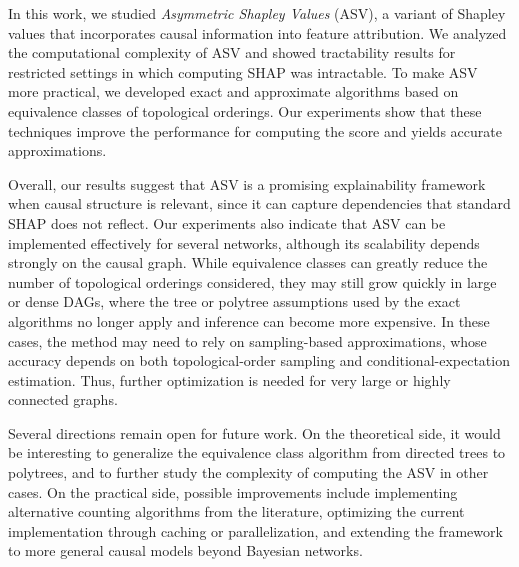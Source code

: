 In this work, we studied \textit{Asymmetric Shapley Values} (ASV), a variant of Shapley values that incorporates causal information into feature attribution. We analyzed the computational complexity of ASV and showed tractability results for restricted settings in which computing SHAP was intractable. To make ASV more practical, we developed exact and approximate algorithms based on equivalence classes of topological orderings. Our experiments show that these techniques improve the performance for computing the score and yields accurate approximations.

Overall, our results suggest that ASV is a promising explainability framework when causal structure is relevant, since it can capture dependencies that standard SHAP does not reflect. Our experiments also indicate that ASV can be implemented effectively for several networks, although its scalability depends strongly on the causal graph. While equivalence classes can greatly reduce the number of topological orderings considered, they may still grow quickly in large or dense DAGs, where the tree or polytree assumptions used by the exact algorithms no longer apply and inference can become more expensive. In these cases, the method may need to rely on sampling-based approximations, whose accuracy depends on both topological-order sampling and conditional-expectation estimation. Thus, further optimization is needed for very large or highly connected graphs.

Several directions remain open for future work. On the theoretical side, it would be interesting to generalize the equivalence class algorithm from directed trees to polytrees, and to further study the complexity of computing the ASV in other cases. On the practical side, possible improvements include implementing alternative counting algorithms from the literature, optimizing the current implementation through caching or parallelization, and extending the framework to more general causal models beyond Bayesian networks.